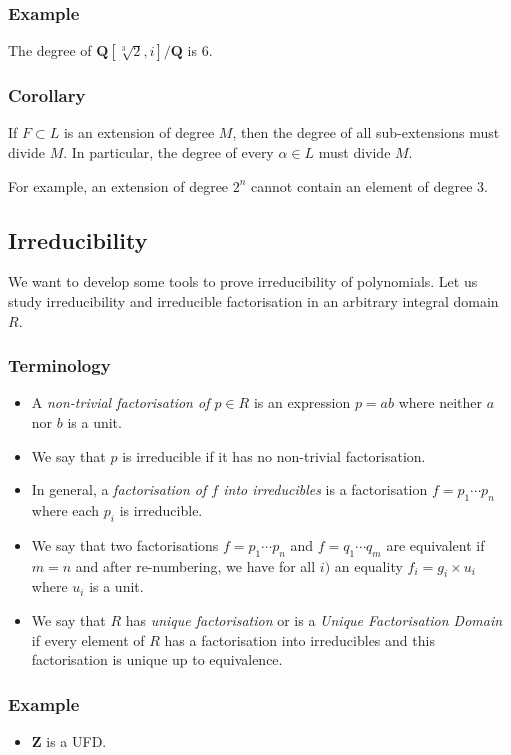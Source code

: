 \documentclass[11pt]{article}
\begin{document}
\subsubsection{Example}
\label{sec:org0badbe0}
The degree of \(\mathbf{Q}[\sqrt[3]2, i] / \mathbf{Q}\) is 6.
\subsubsection{Corollary}
\label{sec:org6321cff}
If \(F \subset L\) is an extension of degree \(M\), then the degree of all sub-extensions must divide \(M\).
In particular, the degree of every \(\alpha \in L\) must divide \(M\).

For example, an extension of degree \(2^{n}\) cannot contain an element of degree 3.
\subsection{Irreducibility}
\label{sec:orge95f844}
We want to develop some tools to prove irreducibility of polynomials.
Let us study irreducibility and irreducible factorisation in an arbitrary integral domain \(R\).
\subsubsection{Terminology}
\label{sec:orge701b84}
\begin{itemize}
\item A \emph{non-trivial factorisation of \(p \in R\)} is an expression \(p = ab\) where neither \(a\) nor \(b\) is a unit.
\item We say that \(p\) is irreducible if it has no non-trivial factorisation.
\item In general, a \emph{factorisation of \(f\) into irreducibles} is a factorisation \(f = p_1 \cdots p_n\) where each \(p_{i}\) is irreducible.
\item We say that two factorisations \(f = p_1 \cdots p_{n}\) and \(f = q_1 \cdots q_{m}\) are equivalent if \(m = n\) and after re-numbering, we have for all \(i)\) an equality \(f_i = g_i \times u_i\) where \(u_i\) is a unit.
\item We say that \(R\) has \emph{unique factorisation} or is a \emph{Unique Factorisation Domain} if every element of \(R\) has a factorisation into irreducibles and this factorisation is unique up to equivalence.
\end{itemize}
\subsubsection{Example}
\label{sec:orgafc154e}
\begin{itemize}
\item \(\mathbf{Z}\) is a UFD.
\end{itemize}
\end{document}
